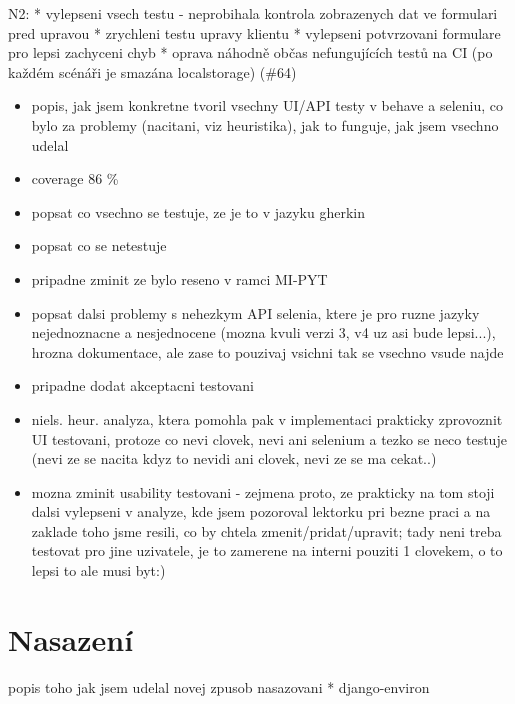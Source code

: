 N2: 
* vylepseni vsech testu - neprobihala kontrola zobrazenych dat ve formulari pred upravou
* zrychleni testu upravy klientu
* vylepseni potvrzovani formulare pro lepsi zachyceni chyb
* oprava náhodně občas nefungujících testů na CI (po každém scénáři je smazána localstorage) (\#64)

\begin{itemize}
\item popis, jak jsem konkretne tvoril vsechny UI/API testy v behave a seleniu, co bylo za problemy (nacitani, viz heuristika), jak to funguje, jak jsem vsechno udelal
\item coverage 86 \%
\item popsat co vsechno se testuje, ze je to v jazyku gherkin
\item popsat co se netestuje
\item pripadne zminit ze bylo reseno v ramci MI-PYT
\item popsat dalsi problemy s nehezkym API selenia, ktere je pro ruzne jazyky nejednoznacne a nesjednocene (mozna kvuli verzi 3, v4 uz asi bude lepsi...), hrozna dokumentace, ale zase to pouzivaj vsichni tak se vsechno vsude najde
\item pripadne dodat akceptacni testovani
\item niels. heur. analyza, ktera pomohla pak v implementaci prakticky zprovoznit UI testovani, protoze co nevi clovek, nevi ani selenium a tezko se neco testuje (nevi ze se nacita kdyz to nevidi ani clovek, nevi ze se ma cekat..)
\item mozna zminit usability testovani - zejmena proto, ze prakticky na tom stoji dalsi vylepseni v analyze, kde jsem pozoroval lektorku pri bezne praci a na zaklade toho jsme resili, co by chtela zmenit/pridat/upravit; tady neni treba testovat pro jine uzivatele, je to zamerene na interni pouziti 1 clovekem, o to lepsi to ale musi byt:)
\end{itemize}


\chapter{Nasazení}
popis toho jak jsem udelal novej zpusob nasazovani
* django-environ

